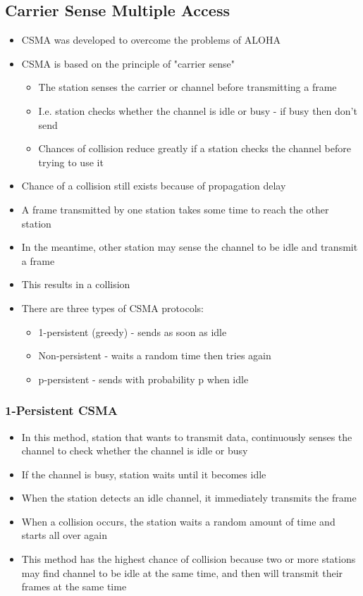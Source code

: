 \documentclass{article}[18pt]
\begin{document}
\subsection{Carrier Sense Multiple Access}
\begin{itemize}
	\item CSMA was developed to overcome the problems of ALOHA
	\item CSMA is based on the principle of "carrier sense"
	\begin{itemize}
		\item The station senses the carrier or channel before transmitting a frame
	\item I.e. station checks whether the channel is idle or busy - if busy then don't send
	\item Chances of collision reduce greatly if a station checks the channel before trying to use it
	\end{itemize}
	\item Chance of a collision still exists because of propagation delay
	\item A frame transmitted by one station takes some time to reach the other station
	\item In the meantime, other station may sense the channel to be idle and transmit a frame
	\item This results in a collision
	\item There are three types of CSMA protocols:
	\begin{itemize}
		\item 1-persistent (greedy) - sends as soon as idle
		\item Non-persistent - waits a random time then tries again
		\item p-persistent - sends with probability p when idle
	\end{itemize}
\end{itemize}
\subsubsection{1-Persistent CSMA}
\begin{itemize}
	\item In this method, station that wants to transmit data, continuously senses the channel to check whether the channel is idle or busy
	\item If the channel is busy, station waits until it becomes idle
	\item When the station detects an idle channel, it immediately transmits the frame
	\item When a collision occurs, the station waits a random amount of time and starts all over again
	\item This method has the highest chance of collision because two or more stations may find channel to be idle at the same time, and then will transmit their frames at the same time
\end{itemize}
\end{document}
